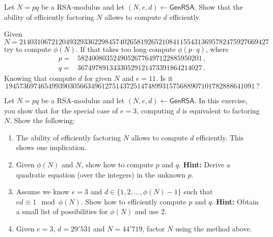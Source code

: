 \documentclass[a4paper,10pt,landscape,twocolumn]{scrartcl}
\begin{document}
\begin{exercise}[RSA]
\begin{subex}
Let $N=pq$ be a RSA-modulus and let
  $(N,e,d) \leftarrow \mathsf{GenRSA}$. 
Show that the ability of efficiently factoring $N$ allows to compute $d$
  efficiently.
  
  Given 
  \begin{equation*}
  N=2140310672120493293362298457402658192652108411554313695782475927669427
  \end{equation*}
  try to compute $\phi(N)$. If that takes too long compute $\phi(p\cdot q)$, where 
  \begin{align*}
  p=&58240080352490526776497122885950201 \, ,\\
  q=&36749789134330529121473391864214027 \, .
  \end{align*}
  Knowing that compute $d$ for given $N$ and $e=11$. Is it 
  \begin{equation*}
  1945736974654993903056634961275143725147489931575688907101782888641091 \  ?
  \end{equation*}
\end{subex}

\begin{subex}
Let $N=pq$ be a RSA-modulus and let
 $(N,e,d) \leftarrow \mathsf{GenRSA}$. In this exercise, you show
 that for the special case of $e=3$, computing $d$ is equivalent to
 factoring $N$. Show the following:
 \begin{enumerate}
 \item The ability of efficiently factoring $N$ allows to compute $d$
 efficiently. This shows one implication.
 \item Given $\phi(N)$ and $N$, show how to compute $p$ and $q$. 
\textbf{Hint:} Derive a quadratic equation (over the integers) in the
   unknown $p$.
   \item Assume we know $e=3$ and $d \in \{1,2,\ldots,\phi(N)-1\}$ such
   that $ed \equiv 1 \mod \phi(N)$. Show how to efficiently compute
   $p$ and $q$. \textbf{Hint:} Obtain a small list of possibilities for
   $\phi(N)$ and use 2.
   \item Given $e=3$, $d=29'531$ and $N=44'719$, factor $N$ using the
 method above.
 \end{enumerate}
\end{subex}
\end{exercise}
\end{document}
